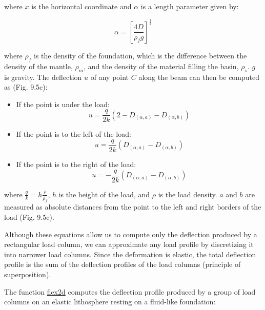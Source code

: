 \documentclass[a4paper , 12pt]{book}
\begin{document}
where $x$ is the horizontal coordinate and $\alpha$ is a length parameter given by:

\begin{equation}
    \alpha=\left[\frac{4D}{\rho_f g}\right]^{\frac{1}{4}}
\end{equation}

where $\rho_f$ is the density of the foundation, which is the difference between the density of the mantle, $\rho_m$, and the density of the material filling the basin, $\rho_s$. $g$ is gravity. The deflection $u$ of any point $C$ along the beam can then be computed as (Fig. 9.5c):

\begin{itemize}
    \item If the point is under the load:
    \begin{equation}
        u = \frac{q}{2k}(2-D_{(\alpha,a)}-D_{(\alpha,b)})
    \end{equation}
    \item If the point is to the left of the load:
    \begin{equation}
        u = \frac{q}{2k}(D_{(\alpha,a)}-D_{(\alpha,b)})
    \end{equation}
    \item If the point is to the right of the load:
    \begin{equation}
        u = -\frac{q}{2k}(D_{(\alpha,a)}-D_{(\alpha,b)})
    \end{equation}
\end{itemize}

where $\frac{q}{k}=h\frac{\rho}{\rho_f}$, $h$ is the height of the load, and $\rho$ is the load density. $a$ and $b$ are measured as absolute distances from the point to the left and right borders of the load (Fig. 9.5c).

Although these equations allow us to compute only the deflection produced by a rectangular load column, we can approximate any load profile by discretizing it into narrower load columns. Since the deformation is elastic, the total deflection profile is the sum of the deflection profiles of the load columns (principle of superposition).

The function \href{https://github.com/nfcd/compGeo/blob/master/source/functions/flex2d.py}{flex2d} computes the deflection profile produced by a group of load columns on an elastic lithosphere resting on a fluid-like foundation:
\end{document}
